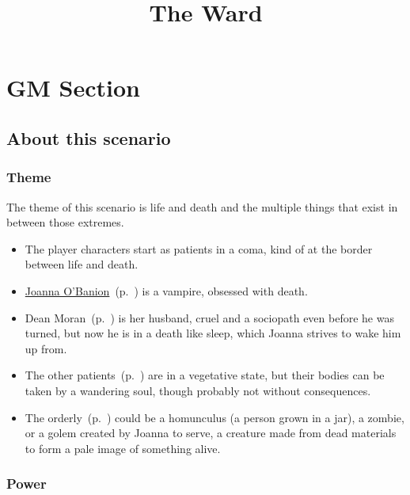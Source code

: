 \documentclass[bg-full]{resources/stylesheets/kult}
\title{The Ward}
\begin{document}




\onecolumn

\section{GM Section}%
\label{sec:gm_section}

\subsection{About this scenario}%
\label{sub:about_this_scenario}

\subsubsection{Theme}%
\label{ssub:theme}

The theme of this scenario is life and death and the multiple things that exist in between those
extremes.
\begin{itemize}[noitemsep]
  \item The player characters start as patients in a coma, kind of at the border between life and death.

  \item \hyperref[ssub:joanna_o_banion]{Joanna O'Banion}~(p.~\pageref{ssub:joanna_o_banion}) is a vampire, obsessed with death.

  \item Dean Moran~(p.~\pageref{ssub:joanna_o_banion}) is her husband, cruel and a sociopath even before he was turned, but now
        he is in a death like sleep, which Joanna strives to wake him up from.

  \item The other patients~(p.~\pageref{ssub:other_patients}) are in a vegetative state, but their bodies can be taken by
    a wandering soul, though probably not without consequences.

  \item The orderly~(p.~\pageref{ssub:orderly}) could be a homunculus (a person grown in a jar), a zombie, or a golem created
        by Joanna to serve, a creature made from dead materials to form a pale image of something alive.
\end{itemize}

\subsubsection{Power}%
\label{ssub:power}
\end{document}
